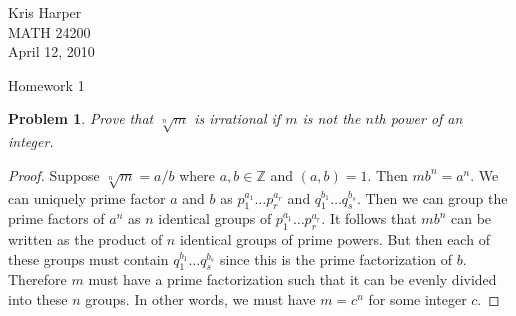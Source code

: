 \documentclass{article}
\newtheorem{problem}{Problem}
\begin{document}
\begin{flushright}
Kris Harper\\

MATH 24200\\

April 12, 2010
\end{flushright}

\begin{center}
Homework 1
\end{center}

\begin{problem}
\label{roots}
Prove that $\sqrt[n]{m}$ is irrational if $m$ is not the $n$th power of an integer.
\end{problem}
\begin{proof}
Suppose $\sqrt[n]{m} = a/b$ where $a,b \in \mathbb{Z}$ and $(a,b) = 1$. Then $mb^n = a^n$. We can uniquely prime factor $a$ and $b$ as $p_1^{a_1} \dots p_r^{a_r}$ and $q_1^{b_1} \dots q_s^{b_s}$. Then we can group the prime factors of $a^n$ as $n$ identical groups of $p_1^{a_1} \dots p_r^{a_r}$. It follows that $mb^n$ can be written as the product of $n$ identical groups of prime powers. But then each of these groups must contain $q_1^{b_1} \dots q_s^{b_s}$ since this is the prime factorization of $b$. Therefore $m$ must have a prime factorization such that it can be evenly divided into these $n$ groups. In other words, we must have $m = c^n$ for some integer $c$.
\end{proof}
\end{document}
